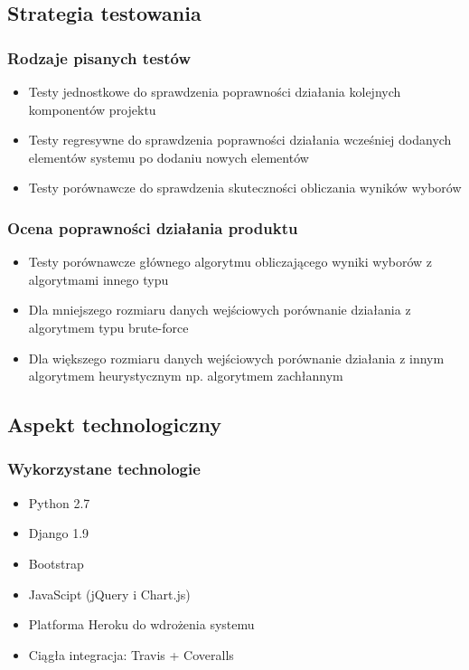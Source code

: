 \documentclass{beamer}
\begin{document}
\subsection{Strategia testowania}

\begin{frame}

\frametitle{Rodzaje pisanych testów}
\begin{itemize}
\item Testy jednostkowe do sprawdzenia poprawności działania kolejnych komponentów projektu
\item Testy regresywne do sprawdzenia poprawności działania wcześniej dodanych elementów systemu po dodaniu nowych elementów
\item Testy porównawcze do sprawdzenia skuteczności obliczania wyników wyborów
\end{itemize}

\end{frame}

\begin{frame}

\frametitle{Ocena poprawności działania produktu}
\begin{itemize}
\item Testy porównawcze głównego algorytmu obliczającego wyniki wyborów z algorytmami innego typu
\item Dla mniejszego rozmiaru danych wejściowych porównanie działania z algorytmem typu brute-force
\item Dla większego rozmiaru danych wejściowych porównanie działania z innym algorytmem heurystycznym np. algorytmem zachłannym
\end{itemize}

\end{frame}

\subsection{Aspekt technologiczny}

\begin{frame}

\frametitle{Wykorzystane technologie}
\begin{itemize}
\item Python 2.7
\item Django 1.9
\item Bootstrap
\item JavaScipt (jQuery i Chart.js)
\item Platforma Heroku do wdrożenia systemu
\item Ciągła integracja: Travis + Coveralls
\end{itemize}

\end{frame}
\end{document}

